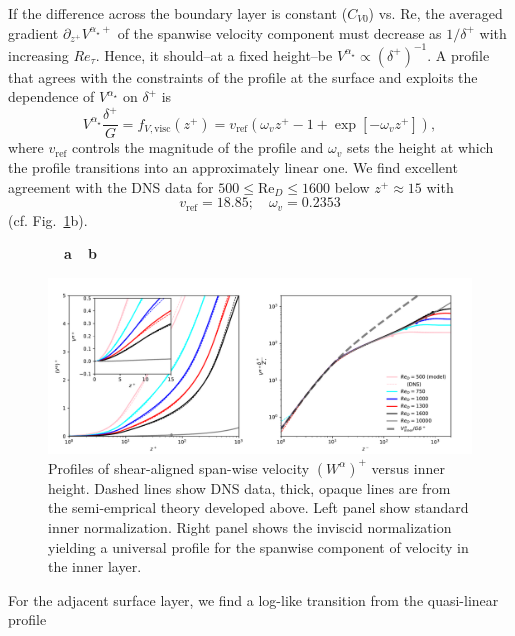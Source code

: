 \documentclass[a4paper,11pt]{amsart}
\newcommand{\RE}{\mathrm{Re}}
\begin{document}
If the difference across the boundary layer is constant ($C_{V0}$) vs. $\RE$,
the averaged gradient $\partial_{z^+} V^{\alpha_\star+}$ of the spanwise velocity component
must decrease as $1/\delta^+$ with increasing $Re_\tau$. 
%
Hence, it should--at a fixed height--be $V^{\alpha_\star} \propto \left(\delta^{+}\right)^{-1}$.
%
A profile that agrees with the constraints of the profile at the surface
and exploits the dependence of $V^{\alpha_\star}$ on $\delta^+$ is 
\begin{equation}
  V^{\alpha_\star}\frac{\delta^+}{G} = f_{V,\mathrm{visc}}(z^+) = v_\mathrm{ref} \left( \omega_v z^+ -1 + \exp[-\omega_v z^+]\right),
  \label{eqn:scaling_spanwise} 
\end{equation}
where $v_\mathrm{ref}$ controls the magnitude of the profile and $\omega_v$ sets the height at which the profile
transitions into an approximately linear one.
%
We find excellent agreement with the DNS data for $500\le\RE_D\le1600$ below $z^+\approx 15$ with
\[v_\mathrm{ref} = 18.85;  \quad \omega_v=0.2353\]
(cf. Fig.~\ref{fig:inner_w}b). 
%
\begin{figure}
  \begin{flushleft}
    \textbf{\ \ a}\hspace{0.45\textwidth}\textbf{\ \ b}\\
  \end{flushleft} 
  \includegraphics[width=1.0\textwidth]{../plot/w_profile.pdf}
  \caption{Profiles of shear-aligned span-wise velocity $(W^\alpha)^+$ versus inner height. 
    Dashed lines show DNS data, thick, opaque lines are from the semi-emprical theory developed above.
    Left panel show standard inner normalization. Right panel shows the inviscid normalization yielding
    a universal profile for the spanwise component of velocity in the inner layer. }
  \label{fig:inner_w}
\end{figure}
\par
%
For the adjacent surface layer, we find a log-like transition from the quasi-linear profile
\end{document}
